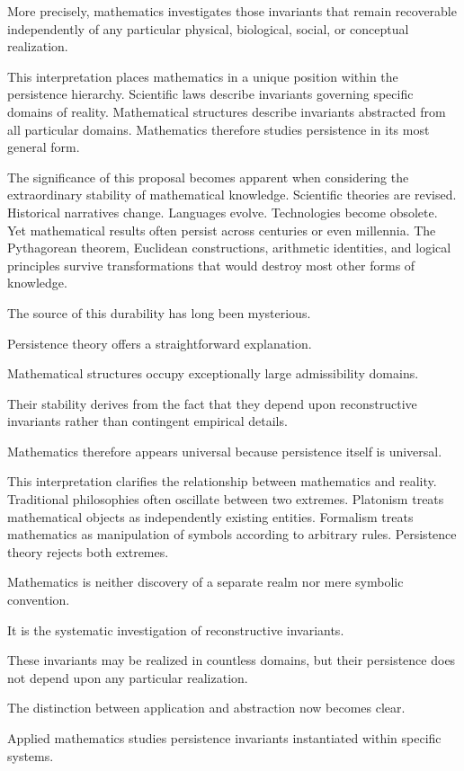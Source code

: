 \documentclass[12pt,oneside]{article}
\theoremstyle{definition}
\begin{document}
More precisely, mathematics investigates those invariants that remain recoverable independently of any particular physical, biological, social, or conceptual realization.

This interpretation places mathematics in a unique position within the persistence hierarchy. Scientific laws describe invariants governing specific domains of reality. Mathematical structures describe invariants abstracted from all particular domains. Mathematics therefore studies persistence in its most general form.

The significance of this proposal becomes apparent when considering the extraordinary stability of mathematical knowledge. Scientific theories are revised. Historical narratives change. Languages evolve. Technologies become obsolete. Yet mathematical results often persist across centuries or even millennia. The Pythagorean theorem, Euclidean constructions, arithmetic identities, and logical principles survive transformations that would destroy most other forms of knowledge.

The source of this durability has long been mysterious.

Persistence theory offers a straightforward explanation.

Mathematical structures occupy exceptionally large admissibility domains.

Their stability derives from the fact that they depend upon reconstructive invariants rather than contingent empirical details.

Mathematics therefore appears universal because persistence itself is universal.

This interpretation clarifies the relationship between mathematics and reality. Traditional philosophies often oscillate between two extremes. Platonism treats mathematical objects as independently existing entities. Formalism treats mathematics as manipulation of symbols according to arbitrary rules. Persistence theory rejects both extremes.

Mathematics is neither discovery of a separate realm nor mere symbolic convention.

It is the systematic investigation of reconstructive invariants.

These invariants may be realized in countless domains, but their persistence does not depend upon any particular realization.

The distinction between application and abstraction now becomes clear.

Applied mathematics studies persistence invariants instantiated within specific systems.
\end{document}
